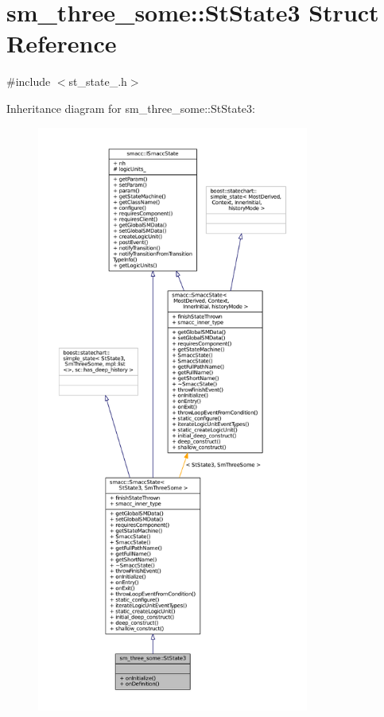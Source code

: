 \hypertarget{structsm__three__some_1_1StState3}{}\section{sm\+\_\+three\+\_\+some\+:\+:St\+State3 Struct Reference}
\label{structsm__three__some_1_1StState3}


{\ttfamily \#include $<$st\+\_\+state\+\_.\+h$>$}



Inheritance diagram for sm\+\_\+three\+\_\+some\+:\+:St\+State3\+:
\nopagebreak
\begin{figure}[H]
\begin{center}
\leavevmode
\includegraphics[height=550pt]{structsm__three__some_1_1StState3__inherit__graph}
\end{center}
\end{figure}


